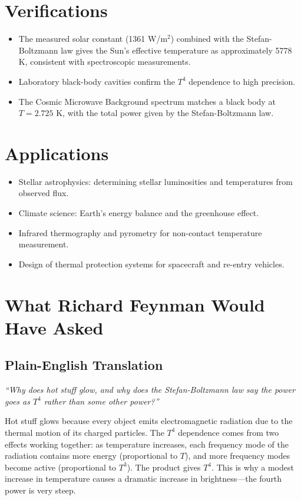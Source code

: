 \documentclass[11pt,openright]{book}
\begin{document}
\section*{Verifications}

\begin{itemize}
    \item The measured solar constant (1361 W/m$^2$) combined with the Stefan-Boltzmann law gives the Sun's effective temperature as approximately 5778 K, consistent with spectroscopic measurements.
    \item Laboratory black-body cavities confirm the $T^4$ dependence to high precision.
    \item The Cosmic Microwave Background spectrum matches a black body at $T = 2.725$ K, with the total power given by the Stefan-Boltzmann law.
\end{itemize}
\section*{Applications}

\begin{itemize}
    \item Stellar astrophysics: determining stellar luminosities and temperatures from observed flux.
    \item Climate science: Earth's energy balance and the greenhouse effect.
    \item Infrared thermography and pyrometry for non-contact temperature measurement.
    \item Design of thermal protection systems for spacecraft and re-entry vehicles.
\end{itemize}
\section*{What Richard Feynman Would Have Asked}

\subsection*{Plain-English Translation}
\textit{``Why does hot stuff glow, and why does the Stefan-Boltzmann law say the power goes as $T^4$ rather than some other power?''}

Hot stuff glows because every object emits electromagnetic radiation due to the thermal motion of its charged particles. The $T^4$ dependence comes from two effects working together: as temperature increases, each frequency mode of the radiation contains more energy (proportional to $T$), and more frequency modes become active (proportional to $T^3$). The product gives $T^4$. This is why a modest increase in temperature causes a dramatic increase in brightness---the fourth power is very steep.
\end{document}
